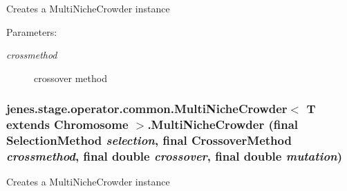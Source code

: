 Creates a MultiNicheCrowder instance

\begin{Desc}
\item[Parameters:]
\begin{description}
\item[{\em crossmethod}]crossover method \end{description}
\end{Desc}
\hypertarget{classjenes_1_1stage_1_1operator_1_1common_1_1_multi_niche_crowder_3_01_t_01extends_01_chromosome_01_4_d6b691057f10397e80669b101c7f437a}{
\subsubsection[MultiNicheCrowder]{\setlength{\rightskip}{0pt plus 5cm}jenes.stage.operator.common.MultiNicheCrowder$<$ T extends Chromosome $>$.MultiNicheCrowder (final {\bf SelectionMethod} {\em selection}, \/  final {\bf CrossoverMethod} {\em crossmethod}, \/  final double {\em crossover}, \/  final double {\em mutation})}}
\label{classjenes_1_1stage_1_1operator_1_1common_1_1_multi_niche_crowder_3_01_t_01extends_01_chromosome_01_4_d6b691057f10397e80669b101c7f437a}


Creates a MultiNicheCrowder instance

